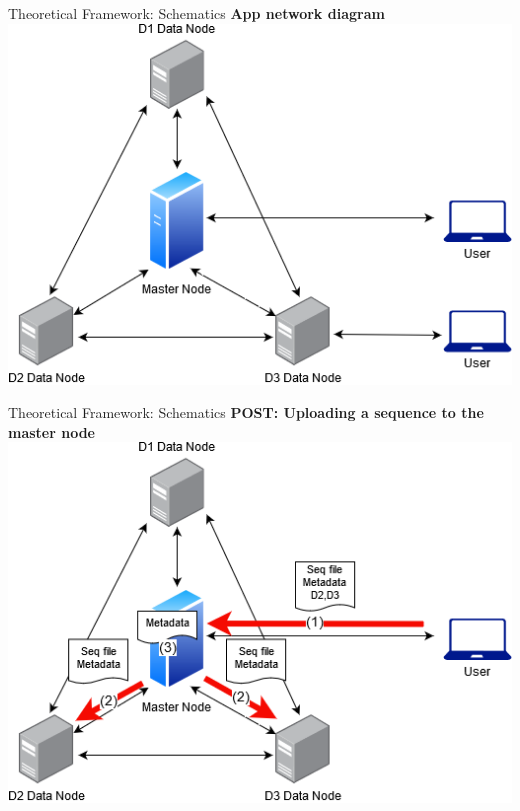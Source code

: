 \documentclass{beamer}
\begin{document}
\begin{frame}{Theoretical Framework: Schematics}
\textbf{App network diagram} \\ \medskip
\centering
\includegraphics[scale=0.5]{thesis1.png}
\end{frame}

\begin{frame}{Theoretical Framework: Schematics}
\textbf{POST: Uploading a sequence to the master node} \\ \medskip
\centering
\includegraphics[scale=0.5]{thesis3.png}
\end{frame}
\end{document}

